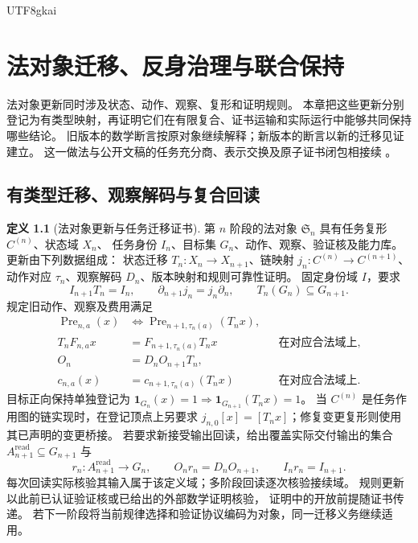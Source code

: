 \documentclass[12pt,a4paper,openany,notitlepage]{report}
\theoremstyle{plain}
\theoremstyle{definition}
\newtheorem{definition}[theorem]{定义}
\theoremstyle{remark}
\def\mathcal#1{#1}\def\mathsf#1{#1}\def\mathbb#1{#1}%
\begin{document}
\begin{CJK*}{UTF8}{gkai}
\chapter{法对象迁移、反身治理与联合保持}
\label{exp:ch:governance}

\label{hgov:sec:governance}

法对象更新同时涉及状态、动作、观察、复形和证明规则。
本章把这些更新分别登记为有类型映射，再证明它们在有限复合、证书运输和实际运行中能够共同保持哪些结论。
旧版本的数学断言按原对象继续解释；新版本的断言以新的迁移见证建立。
这一做法与公开文稿的任务充分商、表示交换及原子证书闭包相接续
\cite{S38,GFrameworkSynthesis}。

\section{有类型迁移、观察解码与复合回读}
\label{exp:gov:migration-section}

\begin{definition}[法对象更新与任务迁移证书]
\label{hgov:def:migration}
第 $n$ 阶段的法对象 $\mathfrak S_n$ 具有任务复形 $C^{(n)}$、状态域 $X_n$、
任务身份 $I_n$、目标集 $G_n$、动作、观察、验证核及能力库。
更新由下列数据组成：
状态迁移 $T_n:X_n\to X_{n+1}$、链映射 $j_n:C^{(n)}\to C^{(n+1)}$、
动作对应 $\tau_n$、观察解码 $D_n$、版本映射和规则可靠性证明。
固定身份域 $\mathcal I$，要求
\[
I_{n+1}T_n=I_n,\qquad
\partial_{n+1}j_n=j_n\partial_n,\qquad
T_n(G_n)\subseteq G_{n+1}.
\]
规定旧动作、观察及费用满足
\[
\begin{aligned}
 \operatorname{Pre}_{n,a}(x)
 &\Longleftrightarrow
 \operatorname{Pre}_{n+1,\tau_n(a)}(T_nx),\\
 T_nF_{n,a}x&=F_{n+1,\tau_n(a)}T_nx
 &&\text{在对应合法域上},\\
 O_n&=D_nO_{n+1}T_n,\\
 c_{n,a}(x)&=c_{n+1,\tau_n(a)}(T_nx)
 &&\text{在对应合法域上}.
\end{aligned}
\]
目标正向保持单独登记为
$\mathbf1_{G_n}(x)=1\Rightarrow\mathbf1_{G_{n+1}}(T_nx)=1$。
当 $C^{(n)}$ 是任务作用图的链实现时，在登记顶点上另要求
$j_{n,0}[x]=[T_nx]$；修复变更复形则使用其已声明的变更桥接。
若要求新接受输出回读，给出覆盖实际交付输出的集合
$\mathcal A_{n+1}^{\mathrm{read}}\subseteq G_{n+1}$ 与
\[
 r_n:\mathcal A_{n+1}^{\mathrm{read}}\longrightarrow G_n,\qquad
 O_nr_n=D_nO_{n+1},\qquad I_nr_n=I_{n+1}.
\]
每次回读实际核验其输入属于该定义域；多阶段回读逐次核验接续域。
规则更新以此前已认证验证核或已给出的外部数学证明核验，
证明中的开放前提随证书传递。
若下一阶段将当前规律选择和验证协议编码为对象，同一迁移义务继续适用。
\end{definition}


\end{CJK*}
\end{document}

